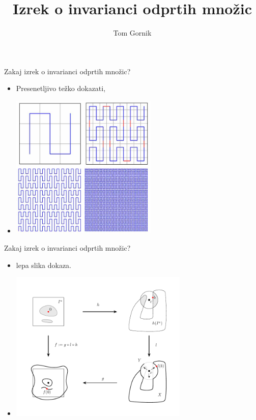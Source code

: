 \documentclass[t]{beamer} %
\title{Izrek o invarianci odprtih množic}
\author{Tom Gornik}
\institute{mentor: izr.\ prof.\ dr.\ Jaka Smrekar}
\begin{document}
\begin{frame}
  \maketitle
\end{frame}



\begin{frame}{Zakaj izrek o invarianci odprtih množic?}
\begin{itemize}
\item Presenetljivo težko dokazati,
\item<2>[] \includegraphics[width=7cm]{peano_curve.jpg}
\end{itemize}
\end{frame}

\begin{frame}{Zakaj izrek o invarianci odprtih množic?}
\begin{itemize}
\item lepa slika dokaza.
\item<2>[] \includegraphics[width=8.5cm]{glavna_slika.pdf}
\end{itemize}
\end{frame}
\end{document}
